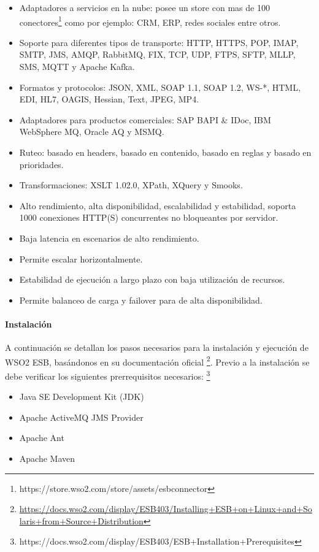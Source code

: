 \begin{itemize}
  \item Adaptadores a servicios en la nube: posee un store con mas de 100 conectores\footnote{https://store.wso2.com/store/assets/esbconnector} como por ejemplo: CRM, ERP, redes sociales entre otros.
  \item Soporte para diferentes tipos de transporte: HTTP, HTTPS, POP, IMAP, SMTP, JMS, AMQP, RabbitMQ, FIX, TCP, UDP, FTPS, SFTP, MLLP, SMS, MQTT y Apache Kafka.
  \item Formatos y protocolos: JSON, XML, SOAP 1.1, SOAP 1.2, WS-*, HTML, EDI, HL7, OAGIS, Hessian, Text, JPEG, MP4.
  \item Adaptadores para productos comerciales: SAP BAPI \& IDoc, IBM WebSphere MQ, Oracle AQ y MSMQ.
  \item Ruteo: basado en headers, basado en contenido, basado en reglas y basado en prioridades.
  \item Transformaciones: XSLT 1.0\/2.0, XPath, XQuery y Smooks.
  \item Alto rendimiento, alta disponibilidad, escalabilidad y estabilidad, soporta 1000 conexiones HTTP(S) concurrentes no bloqueantes por servidor.
  \item Baja latencia en escenarios de alto rendimiento.
  \item Permite escalar horizontalmente.
  \item Estabilidad de ejecución a largo plazo con baja utilización de recursos.
  \item Permite balanceo de carga y failover para  de alta disponibilidad.
\end{itemize}


\paragraph{Instalación}

A continuación se detallan los pasos necesarios para la instalación y ejecución de WSO2 ESB, basándonos en su documentación oficial \footnote{\url{https://docs.wso2.com/display/ESB403/Installing+ESB+on+Linux+and+Solaris+from+Source+Distribution}}.  Previo a la instalación se debe verificar los siguientes prerrequisitos necesarios: \footnote{https://docs.wso2.com/display/ESB403/ESB+Installation+Prerequisites}

\begin{itemize}
  \item Java SE Development Kit (JDK)
  \item Apache ActiveMQ JMS Provider
  \item Apache Ant
  \item Apache Maven
\end{itemize}

